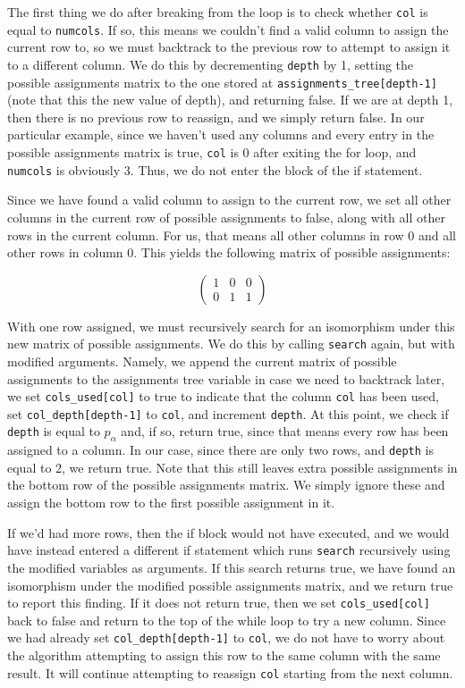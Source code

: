 \documentclass{article}
\begin{document}
  The first thing we do after breaking from the loop is to check whether \texttt{col} is equal to \texttt{numcols}. If so, this means we couldn't find a valid column to assign the current row to, so we must backtrack to the previous row to attempt to assign it to a different column. We do this by decrementing \texttt{depth} by 1, setting the possible assignments matrix to the one stored at \texttt{assignments\_tree[depth-1]} (note that this the new value of depth), and returning false. If we are at depth 1, then there is no previous row to reassign, and we simply return false. In our particular example, since we haven't used any columns and every entry in the possible assignments matrix is true, \texttt{col} is 0 after exiting the for loop, and \texttt{numcols} is obviously 3. Thus, we do not enter the block of the if statement.

  Since we have found a valid column to assign to the current row, we set all other columns in the current row of possible assignments to false, along with all other rows in the current column. For us, that means all other columns in row 0 and all other rows in column 0. This yields the following matrix of possible assignments:

  \[ \begin{pmatrix}
      1 & 0 & 0 \\
      0 & 1 & 1
  \end{pmatrix} \]

  With one row assigned, we must recursively search for an isomorphism under this new matrix of possible assignments. We do this by calling \texttt{search} again, but with modified arguments. Namely, we append the current matrix of possible assignments to the assignments tree variable in case we need to backtrack later, we set \texttt{cols\_used[col]} to true to indicate that the column \texttt{col} has been used, set \texttt{col\_depth[depth-1]} to \texttt{col}, and increment \texttt{depth}. At this point, we check if \texttt{depth} is equal to $p_{\alpha}$ and, if so, return true, since that means every row has been assigned to a column. In our case, since there are only two rows, and \texttt{depth} is equal to 2, we return true. Note that this still leaves extra possible assignments in the bottom row of the possible assignments matrix. We simply ignore these and assign the bottom row to the first possible assignment in it. 
  
  If we'd had more rows, then the if block would not have executed, and we would have instead entered a different if statement which runs \texttt{search} recursively using the modified variables as arguments. If this search returns true, we have found an isomorphism under the modified possible assignments matrix, and we return true to report this finding. If it does not return true, then we set \texttt{cols\_used[col]} back to false and return to the top of the while loop to try a new column. Since we had already set \texttt{col\_depth[depth-1]} to \texttt{col}, we do not have to worry about the algorithm attempting to assign this row to the same column with the same result. It will continue attempting to reassign \texttt{col} starting from the next column.
\end{document}
